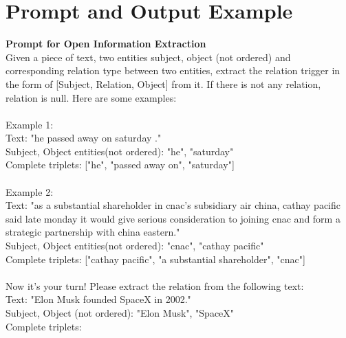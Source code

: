 \section{Prompt and Output Example}
\label{app:prompt}
\begin{table*}[ht]
    \centering
    \begin{mdframed}[linewidth=1pt] %
        \textbf{Prompt for Open Information Extraction} \\
        \hrulefill
Given a piece of text, two entities subject, object (not ordered) and corresponding relation type between two entities, extract the relation trigger in the form of [Subject, Relation, Object] from it. If there is not any relation, relation is null.
Here are some examples: \\
\\
Example 1: \\
Text: "he passed away on saturday ."\\
Subject, Object entities(not ordered): "he", "saturday" \\
Complete triplets: ["he", "passed away on", "saturday"] \\
\\
Example 2: \\
Text: "as a substantial shareholder in cnac's subsidiary air china, cathay pacific said late monday it would give serious consideration to joining cnac and form a strategic partnership with china eastern." \\
Subject, Object entities(not ordered): "cnac", "cathay pacific" \\
Complete triplets: ["cathay pacific", "a substantial shareholder", "cnac"] \\
\\
Now it's your turn! Please extract the relation from the following text: \\
Text: "Elon Musk founded SpaceX in 2002." \\
Subject, Object (not ordered): "Elon Musk", "SpaceX" \\
Complete triplets: 
    \end{mdframed}

    \vspace{5pt} %


\end{table*}
